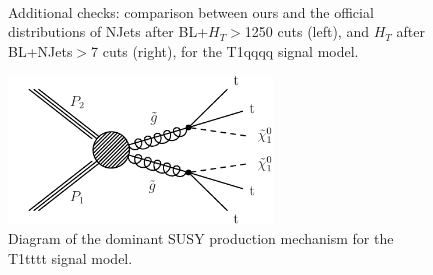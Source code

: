         \begin{figure}
        \centering
        \hspace{-1 cm}
        ~ %
        \caption{Additional checks: comparison between ours and the official distributions of NJets after BL+$H_T$$>$1250 cuts (left), and $H_T$ after BL+NJets$>$7 cuts (right), for the T1qqqq signal model.}
        \end{figure}        

\clearpage

\begin{figure}[h!]
\centering
\includegraphics[width=7cm]{figures/Appendices/Ma5ValidationSUS13012/T1tttt.pdf}
\caption{Diagram of the dominant SUSY production mechanism
for the T1tttt signal model.}
\label{fig:T1tttt}
\end{figure}

